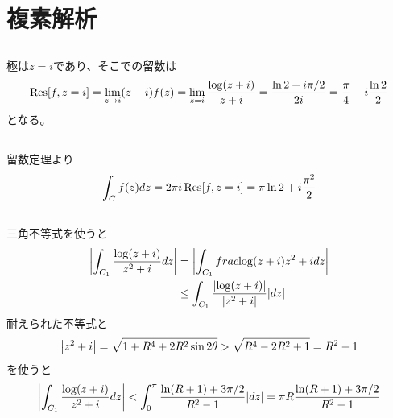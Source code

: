 \documentclass[../ap_2011.tex]{subfiles}
\begin{document}
\setcounter{chapter}{2}
\chapter{複素解析}
\section{}
極は\(z=i\)であり、そこでの留数は
\begin{equation}\begin{aligned}[b]
    \Res[f,z=i]=\lim_{z\to i}(z-i)f(z)=\lim_{z=i}\frac{\log(z+i)}{z+i}=\frac{\ln2+i\pi/2}{2i}=\frac{\pi}{4}-i\frac{\ln2}{2}
\end{aligned}\end{equation}
となる。
\section{}
留数定理より
\begin{equation}\begin{aligned}[b]
    \int_C f(z)dz = 2\pi i\Res[f,z=i]=\pi\ln2+i\frac{\pi^2}{2}
\end{aligned}\end{equation}

\section{}
三角不等式を使うと
\begin{equation}\begin{aligned}[b]
    \abs{\int_{C_1}\frac{\log(z+i)}{z^2+i}dz}
    &=\abs{\int_{C_1}frac{\log(z+i)}{z^2+i}dz}\\
    &\leq\int_{C_1}\frac{\abs{\log(z+i)}}{\abs{z^2+i}}\abs{dz}
\end{aligned}\end{equation}
耐えられた不等式と
\begin{equation}\begin{aligned}[b]
    \abs{z^2+i}=\sqrt{1+R^4+2R^2\sin2\theta}>\sqrt{R^4-2R^2+1}=R^2-1
\end{aligned}\end{equation}
を使うと
\begin{equation}\begin{aligned}[b]
    \abs{\int_{C_1}\frac{\log(z+i)}{z^2+i}dz}
    <\int_{0}^\pi\frac{\ln(R+1)+3\pi/2}{R^2-1}\abs{dz}
    =\pi R\frac{\ln(R+1)+3\pi/2}{R^2-1}
\end{aligned}\end{equation}
\end{document}
